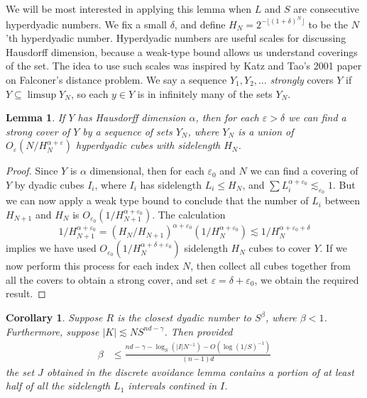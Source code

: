 \documentclass{article}
\theoremstyle{plain}
\newtheorem{lemma}{Lemma}
\newtheorem*{corollary}{Corollary}
\theoremstyle{plain}
\begin{document}
We will be most interested in applying this lemma when $L$ and $S$ are consecutive hyperdyadic numbers. We fix a small $\delta$, and define $H_N = 2^{-\lfloor (1 + \delta)^N \rfloor}$ to be the $N$'th hyperdyadic number. Hyperdyadic numbers are useful scales for discussing Hausdorff dimension, because a weak-type bound allows us understand coverings of the set. The idea to use such scales was inspired by Katz and Tao's 2001 paper on Falconer's distance problem. We say a sequence $Y_1, Y_2, \dots$ {\it strongly} covers $Y$ if $Y \subseteq \limsup Y_N$, so each $y \in Y$ is in infinitely many of the sets $Y_N$.

\begin{lemma}
	If $Y$ has Hausdorff dimension $\alpha$, then for each $\varepsilon > \delta$ we can find a strong cover of $Y$ by a sequence of sets $Y_N$, where $Y_N$ is a union of $O_\varepsilon(N/H_N^{\alpha + \varepsilon})$ hyperdyadic cubes with sidelength $H_N$.
\end{lemma}
\begin{proof}
	Since $Y$ is $\alpha$ dimensional, then for each $\varepsilon_0$ and $N$ we can find a covering of $Y$ by dyadic cubes $I_i$, where $I_i$ has sidelength $L_i \leq H_N$, and $\sum L_i^{\alpha + \varepsilon_0} \lesssim_{\varepsilon_0} 1$. But we can now apply a weak type bound to conclude that the number of $L_i$ between $H_{N+1}$ and $H_N$ is $O_{\varepsilon_0}(1/H_{N+1}^{\alpha + \varepsilon_0})$. The calculation
	\[ 1/H_{N+1}^{\alpha + \varepsilon_0} = (H_N/H_{N+1})^{\alpha + \varepsilon_0} (1/H_N^{\alpha + \varepsilon_0}) \lesssim 1/H_N^{\alpha + \varepsilon_0 + \delta} \]
	implies we have used $O_{\varepsilon_0}(1/H_N^{\alpha + \delta + \varepsilon_0})$ sidelength $H_N$ cubes to cover $Y$. If we now perform this process for each index $N$, then collect all cubes together from all the covers to obtain a strong cover, and set $\varepsilon = \delta + \varepsilon_0$, we obtain the required result.
\end{proof}

\begin{corollary}
	Suppose $R$ is the closest dyadic number to $S^\beta$, where $\beta < 1$. Furthermore, suppose $|K| \lesssim N S^{nd - \gamma}$. Then provided
	\begin{align*}
		\beta &\leq \frac{nd - \gamma - \log_S(|I|N^{-1}) - O \left( \log(1/S)^{-1} \right)}{(n-1)d}%
	\end{align*}
	the set $J$ obtained in the discrete avoidance lemma contains a portion of at least half of all the sidelength $L_1$ intervals contined in $I$.
\end{corollary}
\end{document}
